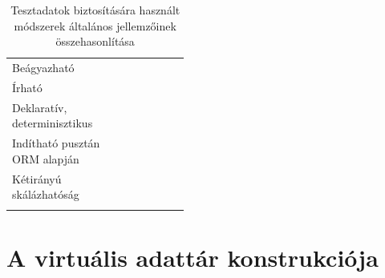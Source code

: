 \documentclass[
    parspace,
    noindent,
    nohyp,
]{elteiktdk}[2023/04/10]
\newcommand{\rhpad}{\vspace{0.6\baselineskip}}
\begin{document}
\begin{table}[H]
\begin{center}
\begin{tabular}{ |p{3.2cm}|c c c c c:c c| }
  \comptablelinesep
  \parbox{\comptableleftwidth}{\rhpad Beágyazható \rhpad} &
     &
     &
     &
     &
     &
     &
     \\
  \comptablelinesep
  \parbox{\comptableleftwidth}{\rhpad Írható \rhpad} &
     &
     &
     &
     &
     &
     &
     \\
  \comptablelinesep
  \parbox{\comptableleftwidth}{\rhpad Deklaratív, \\ determinisztikus \rhpad} &
     &
     &
     &
     &
     &
     &
     \\
  \comptablelinesep
  \parbox{\comptableleftwidth}{\rhpad Indítható pusztán \\ ORM alapján \rhpad} &
     &
     &
     &
     &
     &
     &
     \\
  \comptablelinesep
  \parbox{\comptableleftwidth}{\rhpad Kétirányú \\ skálázhatóság \rhpad} &
     &
     &
     &
     &
     &
     &
     \\
  \hline
\end{tabular}
\caption[Tesztadatok biztosítására használt módszerek összehasonlítása]{
    Tesztadatok biztosítására használt módszerek általános jellemzőinek összehasonlítása
}
\end{center}
\end{table}



\chapter{A virtuális adattár konstrukciója}
\end{document}
